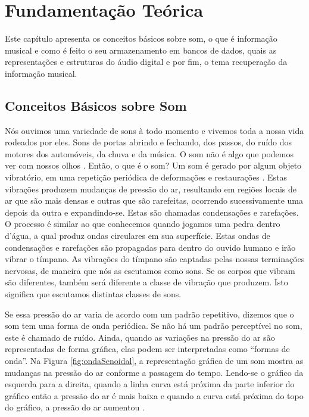 \chapter{Fundamentação Teórica}
Este capítulo apresenta os conceitos básicos sobre som, o que é informação musical e como é feito o seu armazenamento em bancos de dados, quais as representações e estruturas do áudio digital e por fim, o tema recuperação da informação musical.

\section{Conceitos Básicos sobre Som}
Nós ouvimos uma variedade de sons à todo momento e vivemos toda a nossa vida rodeados por eles. Sons de portas abrindo e fechando, dos passos, do ruído dos motores dos automóveis, da chuva e da música. O som não é algo que podemos ver com nossos olhos \cite{miletto2004}. Então, o que é o som? 
Um som é gerado por algum objeto vibratório, em uma repetição periódica de deformações e restaurações \cite{muller2007}. Estas vibrações produzem mudanças de pressão do ar, resultando em regiões locais de ar que são mais densas e outras que são rarefeitas, ocorrendo sucessivamente uma depois da outra e expandindo-se. Estas são chamadas condensações e rarefações. O processo é similar ao que conhecemos quando jogamos uma pedra dentro d’água, a qual produz ondas circulares em sua superfície. Estas ondas de condensações e rarefações são propagadas para dentro do ouvido humano e irão vibrar o tímpano. As vibrações do tímpano são captadas pelas nossas terminações nervosas, de maneira que nós as escutamos como sons. Se os corpos que vibram são diferentes, também será diferente a classe de vibração que produzem. Isto significa que escutamos distintas classes de sons.

Se essa pressão do ar varia de acordo com um padrão repetitivo, dizemos que o som tem uma forma de onda periódica. Se não há um padrão perceptível no som, este é chamado de ruído. Ainda, quando as variações na pressão do ar são representadas de forma gráfica, elas podem ser interpretadas como “formas de onda”. Na Figura \ref{fig:ondaSenoidal}, a representação gráfica de um som mostra as mudanças na pressão do ar conforme a passagem do tempo. Lendo-se o gráfico da esquerda para a direita, quando a linha curva está próxima da parte inferior do gráfico então a pressão do ar é mais baixa e quando a curva está próxima do topo do gráfico, a pressão do ar aumentou \cite{miletto2004}.

